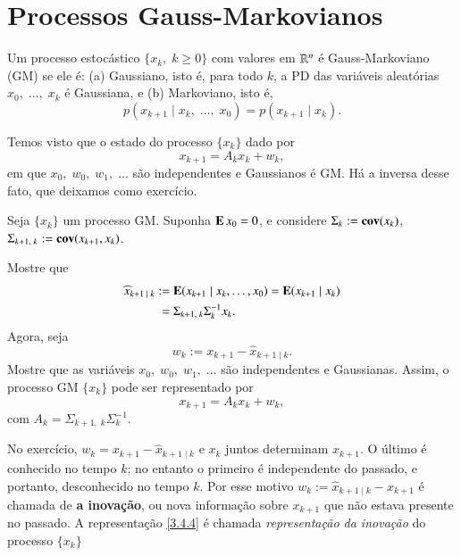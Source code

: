 \section{Processos Gauss-Markovianos}
Um processo estocástico $\{x_k,\;k\ge0\}$ com valores em $\mathbb{R}^n$ é Gauss-Markoviano (GM) se ele é: (a) Gaussiano, isto é, para todo $k$, a PD das variáveis aleatórias $x_0,\;\dots,\;x_k$ é Gaussiana, e (b) Markoviano, isto é,
\begin{equation}\label{3.4.1}
	p(x_{k+1}\;|\;x_k,\;\dots,\;x_0)
	= p(x_{k+1}\;|\;x_k).
\end{equation}

Temos visto que o estado do processo $\{x_k\}$ dado por
\[
    x_{k+1}=A_kx_k+w_k,
\]
em que $x_0,\;w_0,\;w_1,\;\dots$ são independentes e Gaussianos é GM.
Há a inversa desse fato, que deixamos como exercício.

Seja $\{x_k\}$ um processo GM. Suponha $\operatorname{\bf E} x_0=0$, e considere
$\Sigma_k:=\operatorname{\bf cov}(x_k)$, $\Sigma_{k+1,\;k}:=\operatorname{\bf cov}(x_{k+1},x_k)$.
\begin{Exercicio}\label{3.4.2}
Mostre que
\begin{align}\label{3.4.3}
    \widehat x_{k+1\;|\;k} &:=
    \operatorname{\bf E}(x_{k+1}\;|\;x_k,\dots,x_0)
    =\operatorname{\bf E}(x_{k+1}\;|\;x_k)
    \nonumber\\
    &\phantom{:}=\Sigma_{k+1,\;k}\Sigma_k^{-1}x_k.
\end{align}
Agora, seja
\[
    w_k:=x_{k+1}-\widehat x_{k+1\;|\;k}.
\]
Mostre que as variáveis $x_0,\;w_0,\;w_1,\;\dots$ são independentes
e Gaussianas. Assim, o processo GM $\{x_k\}$ pode ser representado por
\begin{equation}\label{3.4.4}
    x_{k+1}=A_kx_k+w_k,
\end{equation}
com $A_k=\Sigma_{k+1,\;k}\Sigma_k^{-1}$.

\noindent
[Dica: a primeira igualdade em \eqref{3.4.3} segue da propriedade de Markov
\eqref{3.4.1}. Para a segunda igualdade e o restante do exercício, proceda
como segue. Mostre que $x_{k+1}-\Sigma_{k+1,\;k}\Sigma_k^{-1}x_k$ e $x_k$
não são correlacionadas calculando sua covariância.
Lembre-se de que duas variáveis aleatórias Gaussianas conjuntamente
são independentes se não estiverem correlacionadas. Por conseguinte,
$\E(\,\widehat x_{k+1}-\Sigma_{k+1,\;k}\Sigma_k^{-1}x_k\;|\;x_k)=0$
e então a segunda igualdade em \eqref{3.4.3} é verificada.]
\end{Exercicio}

No exercício, $w_k=x_{k+1}-\widehat x_{k+1\;|\;k}$ e $x_k$ juntos determinam
$x_{k+1}$. O último é conhecido no tempo $k$; no entanto o primeiro é independente
do passado, e portanto, desconhecido no tempo $k$. Por esse motivo
$w_k:=\widehat x_{k+1\;|\;k}-x_{k+1}$
é chamada de \textbf{a inovação}, ou nova informação sobre $x_{k+1}$
que não estava presente no passado. A representação \eqref{3.4.4} é chamada
\textit{representação da inovação} do processo $\{x_k\}$






